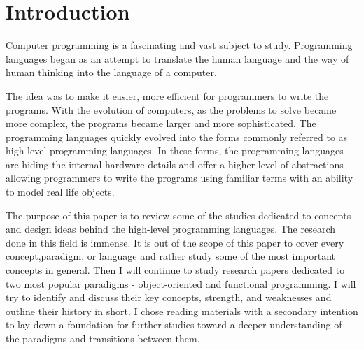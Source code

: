 \documentclass[12pt,twoside,a4paper]{report}
\begin{document}
\section{Introduction}\label{2.1}
Computer programming is a fascinating and vast subject to study. Programming languages began as an attempt to translate the human language and the way of human thinking into the language of a computer.\par
The idea was to make it easier, more efficient for programmers to write the programs. With the evolution of computers, as the problems to solve became more complex, the programs became larger and more sophisticated. The programming languages quickly evolved into the forms commonly referred to as high-level programming languages. In these forms, the programming languages are hiding the internal hardware details and offer a higher level of abstractions allowing programmers to write the programs using familiar terms with an ability to model real life objects.\par
The purpose of this paper is to review some of the studies dedicated to concepts and design ideas behind the high-level programming languages. The research done in this field is immense. It is out of the scope of this paper to cover every concept,paradigm, or language and rather study some of the most important concepts in general. Then I will continue to study research papers dedicated to two most popular paradigms - object-oriented and functional programming. I will try to identify and discuss their key concepts, strength, and weaknesses and outline their history in short. I chose reading materials with a secondary intention to lay down a foundation for further studies toward a deeper understanding of the paradigms and transitions between them.
\end{document}
